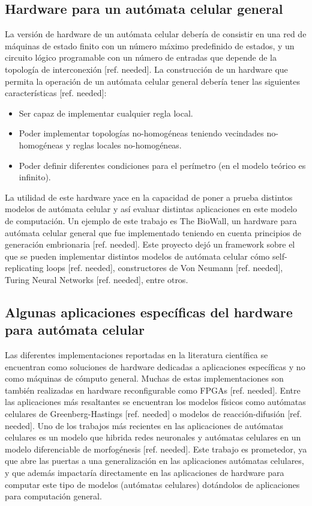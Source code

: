 \documentclass[conference]{IEEEtran}
\begin{document}
\subsection{Hardware para un autómata celular general}
La versión de hardware de un autómata celular debería de consistir en una red de máquinas de estado finito con un número máximo predefinido de estados, y un circuito lógico programable con un número de entradas que depende de la topología de interconexión [ref. needed]. La construcción de un hardware que permita la operación de un autómata celular general debería tener las siguientes características [ref. needed]: 

\begin{itemize}
\item Ser capaz de implementar cualquier regla local.
\item  Poder implementar topologías no-homogéneas teniendo vecindades no-homogéneas y reglas locales no-homogéneas.
\item Poder definir diferentes condiciones para el perímetro (en el modelo teórico es infinito).
\end{itemize}

La utilidad de este hardware yace en la capacidad de poner a prueba distintos modelos de autómata celular y así evaluar distintas aplicaciones en este modelo de computación. Un ejemplo de este trabajo es The BioWall, un hardware para autómata celular general que fue implementado teniendo en cuenta principios de generación embrionaria [ref. needed]. Este proyecto dejó un framework sobre el que se pueden implementar distintos modelos de autómata celular cómo self-replicating loops [ref. needed], constructores de Von Neumann [ref. needed], Turing Neural Networks [ref. needed], entre otros.

\subsection{Algunas aplicaciones específicas del hardware para autómata celular}
Las diferentes implementaciones reportadas en la literatura científica se encuentran como soluciones de hardware dedicadas a aplicaciones específicas y no como máquinas de cómputo general. Muchas de estas implementaciones son también realizadas en hardware reconfigurable como FPGAs [ref. needed].
Entre las aplicaciones más resaltantes se encuentran los modelos físicos como autómatas celulares de Greenberg-Hastings [ref. needed] o modelos de reacción-difusión [ref. needed]. Uno de los trabajos más recientes en las aplicaciones de autómatas celulares es un modelo que hibrida redes neuronales y autómatas celulares en un modelo diferenciable de morfogénesis [ref. needed]. Este trabajo es prometedor, ya que abre las puertas a una generalización en las aplicaciones autómatas celulares, y que además impactaría directamente en las aplicaciones de hardware para computar este tipo de modelos (autómatas celulares) dotándolos de aplicaciones para computación general.
\end{document}
